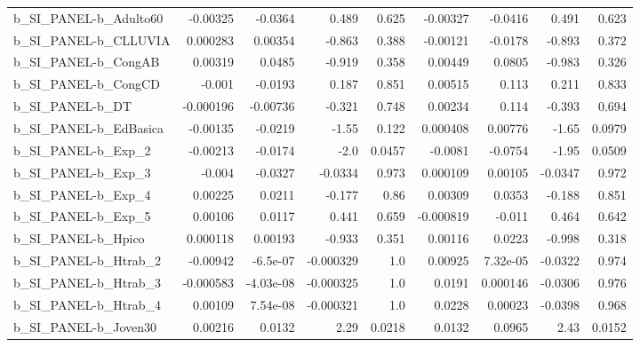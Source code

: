 \begin{tabular}{lrrrrrrrr}
b\_SI\_PANEL-b\_Adulto60      &    -0.00325 &      -0.0364 &     0.489 &    0.625 &   -0.00327 &     -0.0416 &        0.491 &         0.623 \\
b\_SI\_PANEL-b\_CLLUVIA       &    0.000283 &      0.00354 &    -0.863 &    0.388 &   -0.00121 &     -0.0178 &       -0.893 &         0.372 \\
b\_SI\_PANEL-b\_CongAB        &     0.00319 &       0.0485 &    -0.919 &    0.358 &    0.00449 &      0.0805 &       -0.983 &         0.326 \\
b\_SI\_PANEL-b\_CongCD        &      -0.001 &      -0.0193 &     0.187 &    0.851 &    0.00515 &       0.113 &        0.211 &         0.833 \\
b\_SI\_PANEL-b\_DT            &   -0.000196 &     -0.00736 &    -0.321 &    0.748 &    0.00234 &       0.114 &       -0.393 &         0.694 \\
b\_SI\_PANEL-b\_EdBasica      &    -0.00135 &      -0.0219 &     -1.55 &    0.122 &   0.000408 &     0.00776 &        -1.65 &        0.0979 \\
b\_SI\_PANEL-b\_Exp\_2         &    -0.00213 &      -0.0174 &      -2.0 &   0.0457 &    -0.0081 &     -0.0754 &        -1.95 &        0.0509 \\
b\_SI\_PANEL-b\_Exp\_3         &      -0.004 &      -0.0327 &   -0.0334 &    0.973 &   0.000109 &     0.00105 &      -0.0347 &         0.972 \\
b\_SI\_PANEL-b\_Exp\_4         &     0.00225 &       0.0211 &    -0.177 &     0.86 &    0.00309 &      0.0353 &       -0.188 &         0.851 \\
b\_SI\_PANEL-b\_Exp\_5         &     0.00106 &       0.0117 &     0.441 &    0.659 &  -0.000819 &      -0.011 &        0.464 &         0.642 \\
b\_SI\_PANEL-b\_Hpico         &    0.000118 &      0.00193 &    -0.933 &    0.351 &    0.00116 &      0.0223 &       -0.998 &         0.318 \\
b\_SI\_PANEL-b\_Htrab\_2       &    -0.00942 &     -6.5e-07 & -0.000329 &      1.0 &    0.00925 &    7.32e-05 &      -0.0322 &         0.974 \\
b\_SI\_PANEL-b\_Htrab\_3       &   -0.000583 &    -4.03e-08 & -0.000325 &      1.0 &     0.0191 &    0.000146 &      -0.0306 &         0.976 \\
b\_SI\_PANEL-b\_Htrab\_4       &     0.00109 &     7.54e-08 & -0.000321 &      1.0 &     0.0228 &     0.00023 &      -0.0398 &         0.968 \\
b\_SI\_PANEL-b\_Joven30       &     0.00216 &       0.0132 &      2.29 &   0.0218 &     0.0132 &      0.0965 &         2.43 &        0.0152 \\

\end{tabular}
